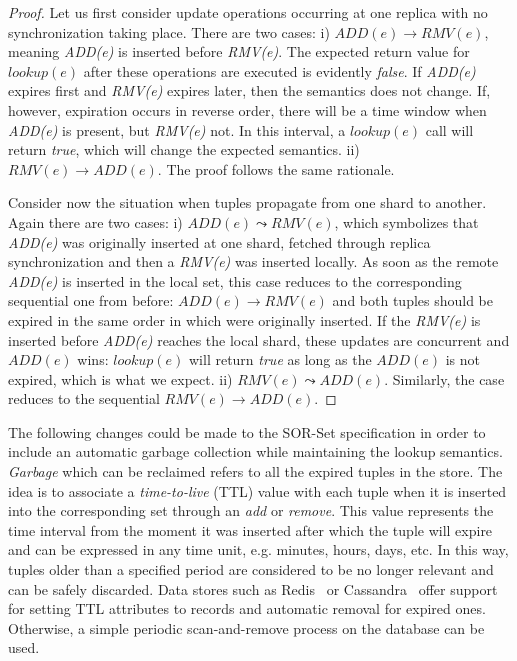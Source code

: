 \begin{proof}
Let us first consider update operations occurring at one replica with no
synchronization taking place. There are two cases: i) $ADD(e) \rightarrow
RMV(e)$, meaning \textit{ADD(e)} is inserted before \textit{RMV(e)}. The
expected return value for $\textit{lookup}(e)$ after these operations are
executed is evidently \textit{false}. If \textit{ADD(e)} expires first and
\textit{RMV(e)} expires later, then the semantics does not change. If, however,
expiration occurs in reverse order, there will be a time window when
\textit{ADD(e)} is present, but \textit{RMV(e)} not. In this interval, a
$\textit{lookup}(e)$ call will return \textit{true}, which will change the
expected semantics. ii) $RMV(e) \rightarrow ADD(e)$. The proof follows the same
rationale.

Consider now the situation when tuples propagate from one shard to another.
Again there are two cases: i) $ADD(e) \leadsto RMV(e)$, which symbolizes that
\textit{ADD(e)} was originally inserted at one shard, fetched through replica
synchronization and then a \textit{RMV(e)} was inserted locally. As soon as the
remote \textit{ADD(e)} is inserted in the local set, this case reduces to the
corresponding sequential one from before: $ADD(e) \rightarrow RMV(e)$ and both
tuples should be expired in the same order in which were originally inserted.
If the \textit{RMV(e)} is inserted before \textit{ADD(e)} reaches the local
shard, these updates are concurrent and $ADD(e)$ wins: $\textit{lookup}(e)$ will
return \textit{true} as long as the $ADD(e)$ is not expired, which is what we
expect. ii) $RMV(e) \leadsto ADD(e)$. Similarly, the case reduces to the
sequential $RMV(e) \rightarrow ADD(e)$.
\end{proof}

The following changes could be made to the SOR-Set specification in order to
include an automatic garbage collection while maintaining the lookup semantics. 
\textit{Garbage} which can be reclaimed refers to all the expired tuples in the
store. The idea is to associate a \textit{time-to-live} (TTL) value with each
tuple when it is inserted into the corresponding set through an \textit{add} or
\textit{remove}. This value represents the time interval from the moment it was
inserted after which the tuple will expire and can be expressed in any time
unit, e.g. minutes, hours, days, etc. In this way, tuples older than a specified
period are considered to be no longer relevant and can be safely discarded. Data
stores such as Redis~\cite{redis} or Cassandra~\cite{cassandra} offer support
for setting TTL attributes to records and automatic removal for expired ones.
Otherwise, a simple periodic scan-and-remove process on the database can be
used.

